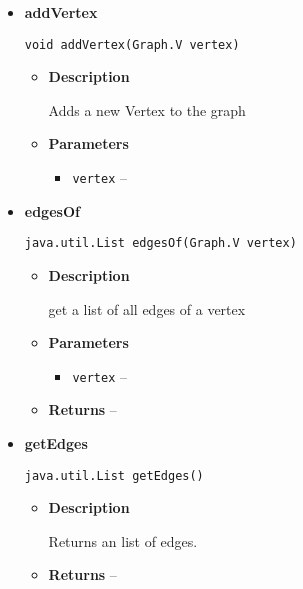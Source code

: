 {{{{{\begin{itemize}
{\begin{itemize}
{Adds a new Edge to the graph
}
\item{
{\bf  Parameters}
  \begin{itemize}
   \item{
\texttt{edge} -- }
  \end{itemize}
}%
\end{itemize}
}%
\item{ 
{\bf  addVertex}\\
\begin{lstlisting}[frame=none]
void addVertex(Graph.V vertex)\end{lstlisting} %
\begin{itemize}
\item{
{\bf  Description}

Adds a new Vertex to the graph
}
\item{
{\bf  Parameters}
  \begin{itemize}
   \item{
\texttt{vertex} -- }
  \end{itemize}
}%
\end{itemize}
}%
\item{ 
{\bf  edgesOf}\\
\begin{lstlisting}[frame=none]
java.util.List edgesOf(Graph.V vertex)\end{lstlisting} %
\begin{itemize}
\item{
{\bf  Description}

get a list of all edges of a vertex
}
\item{
{\bf  Parameters}
  \begin{itemize}
   \item{
\texttt{vertex} -- }
  \end{itemize}
}%
\item{{\bf  Returns} -- 
 
}%
\end{itemize}
}%
\item{ 
{\bf  getEdges}\\
\begin{lstlisting}[frame=none]
java.util.List getEdges()\end{lstlisting} %
\begin{itemize}
\item{
{\bf  Description}

Returns an list of edges.
}
\item{{\bf  Returns} -- 
 
}
\end{itemize}}
\end{itemize}}}}}}
